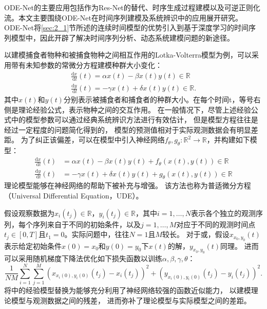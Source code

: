 ODE-Net的主要应用包括作为Res-Net的替代、时序生成过程建模以及可逆正则化流\cite{Grathwohl2019}。本文主要围绕ODE-Net在时间序列建模及系统辨识中的应用展开研究。
ODE-Net将\ref{sec:2_1}节所述的连续时间模型的优势引入到基于深度学习的时间序列模型中，因此开辟了解决时间序列分析、动态系统建模问题的新途径。

以建模捕食者物种和被捕食物种之间相互作用的Lotka-Volterra模型为例，可以采用带有未知参数的常微分方程建模种群大小变化：
\begin{equation}
    \begin{gathered}
    \frac{\mathrm{d} x}{\mathrm{~d} t}(t)=\alpha x(t)-\beta x(t) y(t) \in \mathbb{R} \\
    \frac{\mathrm{d} y}{\mathrm{~d} t}(t)=-\gamma x(t)+\delta x(t) y(t) \in \mathbb{R} .
    \end{gathered}
    \label{equ:2_ode}
\end{equation}
其中$x(t)$和$y(t)$分别表示被捕食者和捕食者的种群大小。在每个时间t，等号右侧是理论经验公式，表示物种之间的交互作用。
在一般情况下，尽管上述经验公式中的模型参数可以通过经典系统辨识方法进行有效估计，
但是模型方程往往是经过一定程度的问题简化得到的，
模型的预测值相对于实际观测数据会有明显差距。
为了纠正该偏差，可以在模型中引入神经网络$f_\theta, g_\theta: \mathbb{R}^2 \rightarrow \mathbb{R}$，并构建如下模型：
\begin{equation}
    \begin{aligned}
    \frac{\mathrm{d} x}{\mathrm{~d} t}(t) &=\alpha x(t)-\beta x(t) y(t)+f_\theta(x(t), y(t)) \in \mathbb{R} \\
    \frac{\mathrm{d} y}{\mathrm{~d} t}(t) &=-\gamma x(t)+\delta x(t) y(t)+g_\theta(x(t), y(t)) \in \mathbb{R}
    \end{aligned}
    \label{equ:2_node}
\end{equation}
理论模型能够在神经网络的帮助下被补充与增强。
该方法也称为普适微分方程（Universal Differential Equation，UDE）\cite{rackauckas2020universal}。

假设观察数据为$x_i\left(t_j\right) \in \mathbb{R}$，$ y_i\left(t_j\right) \in \mathbb{R}$，其中$i=1, \ldots, N$表示各个独立的观测序列，每个序列来自于不同的初始条件，以及$j=1, \ldots, M$对应于不同的观测时间点$t_j \in[0, T]$且$t_1=0$。实际问题中，往往$N=1$且$M$较长。
对于或，假设$x_{x_0, y_0}(t)$表示给定初始条件$x(0)=x_0$和$y(0)=y_0$下$x(t)$的解，$y_{x_0, y_0}(t)$同理。
进而可以采用随机梯度下降法优化如下损失函数以训练$\alpha,\beta,\gamma,\theta$：
\begin{equation}
    \frac{1}{N M} \sum_{i=1}^N \sum_{j=1}^M\left(x_{x_i(0), y_i(0)}\left(t_j\right)-x_i\left(t_j\right)\right)^2+\left(y_{x_i(0), y_i(0)}\left(t_j\right)-y_i\left(t_j\right)\right)^2 .
\end{equation}
将中的经验模型替换为能够充分利用了神经网络较强的函数近似能力，
以建模理论模型与观测数据之间的残差，
进而弥补了理论模型与实际模型之间的差距。

